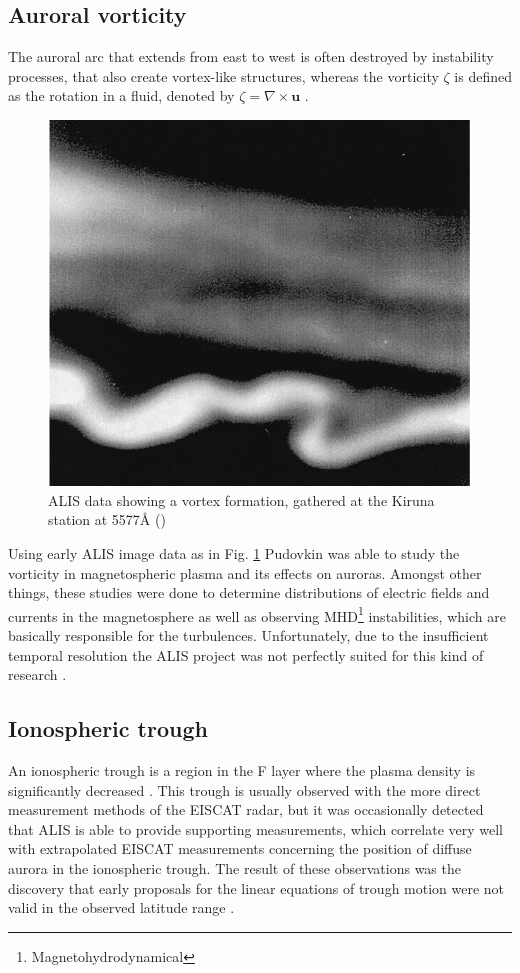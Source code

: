 \subsection{Auroral vorticity}
The auroral arc that extends from east to west is often destroyed by instability processes, that also create vortex-like structures, whereas the vorticity $\zeta$ is defined as the rotation in a fluid, denoted by $\zeta = \nabla \times \textbf{u}$ \citep{brandstrom2003auroral,pudovkin1997vorticity}.
\begin{figure}[!htbp]
\captionsetup{width=0.6\textwidth}
	\centering
	\includegraphics[width=0.6\linewidth]{images/vortex}
		\caption{ALIS data showing a vortex formation, gathered at the Kiruna station at 5577Å (\citep[c.f.][Fig. 14a, modified]{pudovkin1997vorticity})}
		 \label{fig:vortex}
\end{figure}
Using early ALIS image data as in Fig. \ref{fig:vortex} Pudovkin was able to study the vorticity in magnetospheric plasma and its effects on auroras.
Amongst other things, these studies were done to determine distributions of electric fields and currents in the magnetosphere as well as observing MHD\footnote{Magnetohydrodynamical} instabilities, which are basically responsible for the turbulences. Unfortunately, due to the insufficient temporal resolution the ALIS project was not perfectly suited for this kind of research \citep{brandstrom2003auroral}.

\subsection{Ionospheric trough}
An ionospheric trough is a region in the F layer where the plasma density is significantly decreased \citep{spacewiki}. This trough is usually observed with the more direct measurement methods of the EISCAT radar, but it was occasionally detected that ALIS is able to provide supporting measurements, which correlate very well with extrapolated EISCAT measurements concerning the position of diffuse aurora in the ionospheric trough. The result of these observations was the discovery that early proposals for the linear equations of trough motion were not valid in the observed latitude range \citep{brandstrom2003auroral}.

